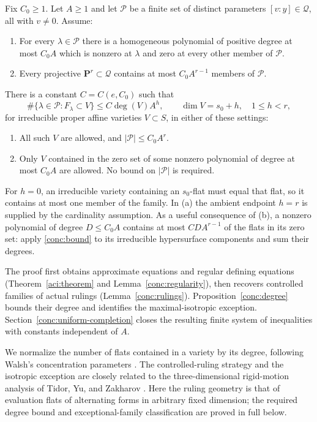 \begin{theorem}
\label{conc:theorem}
Fix $C_0\geq1$.  Let $A\geq1$ and let $\mathcal P$ be a finite set of
distinct parameters $[v:y]\in\mathcal Q$, all with $v\ne0$.  Assume:
\begin{enumerate}
\item[(i)] For every $\lambda\in\mathcal P$ there is a homogeneous polynomial
      of positive degree at most $C_0A$ which is nonzero at $\lambda$ and
      zero at every other member of $\mathcal P$.
\item[(ii)] Every projective $\mathbf P^r\subset\mathcal Q$ contains at most
      $C_0A^{r-1}$ members of $\mathcal P$.
\end{enumerate}
There is a constant $C=C(e,C_0)$ such that
\begin{equation}
 \#\{\lambda\in\mathcal P:F_\lambda\subset V\}
 \leq C\deg(V)A^h,
 \qquad \dim V=s_0+h,\quad 1\leq h<r,
 \label{conc:bound}
\end{equation}
for irreducible proper affine varieties $V\subset S$, in either of these
settings:
\begin{enumerate}
\item[(a)] All such $V$ are allowed, and $|\mathcal P|\leq C_0A^r$.
\item[(b)] Only $V$ contained in the zero set of some nonzero polynomial
      of degree at most $C_0A$ are allowed.  No bound on
      $|\mathcal P|$ is required.
\end{enumerate}
\end{theorem}

For $h=0$, an irreducible variety containing an $s_0$-flat must equal
that flat, so it contains at most one member of the family.  In (a) the
ambient endpoint $h=r$ is supplied by the cardinality assumption.  As a
useful consequence of (b), a nonzero polynomial of degree $D\leq C_0A$
contains at most $CDA^{r-1}$ of the flats in its zero set: apply
\eqref{conc:bound} to its irreducible hypersurface components and sum
their degrees.

The proof first obtains approximate equations and regular defining
equations (Theorem~\ref{aci:theorem} and Lemma~\ref{conc:regularity}),
then recovers controlled families of actual rulings
(Lemma~\ref{conc:rulings}). Proposition~\ref{conc:degree} bounds their degree
and identifies the maximal-isotropic exception.
Section~\ref{conc:uniform-completion} closes the resulting finite
system of inequalities with constants independent of $A$.

We normalize the number of flats contained in a variety by its degree,
following Walsh's concentration parameters
\cite[Section~1.1, definition of \(\mathcal D_m\)]{walsh2023}.  The controlled-ruling strategy and the
isotropic exception are closely related to the three-dimensional
rigid-motion analysis of Tidor, Yu, and Zakharov
\cite[Sections~5--6]{tidoryuzakharov2026}.  Here the ruling geometry is
that of evaluation flats of alternating forms in arbitrary fixed
dimension; the required degree bound and exceptional-family
classification are proved in full below.

